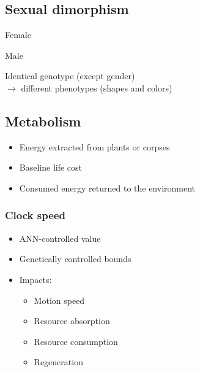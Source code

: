 \documentclass[
auto_sections,
monitor_progress,
draft
]{mannbeamer}
\begin{document}
\subsection{Sexual dimorphism}
\begin{frame}[ok]
 \begin{minipage}[c]{.49\textwidth}
  \centering {}
 \end{minipage}
 \begin{minipage}[c]{.49\textwidth}
  \centering {}
 \end{minipage}
 \vspace{.5\baselineskip}

 \begin{minipage}[c]{.49\textwidth}
  \centering Female
 \end{minipage}
 \begin{minipage}[c]{.49\textwidth}
  \centering Male
 \end{minipage}
 
 \vfill
 Identical genotype (except gender) \\
 $\rightarrow$ different phenotypes (shapes and colors)
\end{frame}

\subsection{Metabolism}
\begin{frame}
 \begin{itemize}
  \item Energy extracted from plants or corpses
  \item Baseline life cost
  \item Consumed energy returned to the environment
 \end{itemize}
\end{frame}

\subsubsection{Clock speed}
\begin{frame}[ok]
 \begin{itemize}
  \item ANN-controlled value
  \item Genetically controlled bounds 
  \item Impacts:
  \begin{itemize}
   \item Motion speed
   \item Resource absorption
   \item Resource consumption
   \item Regeneration
  \end{itemize}
 \end{itemize}
\end{frame}
\end{document}
